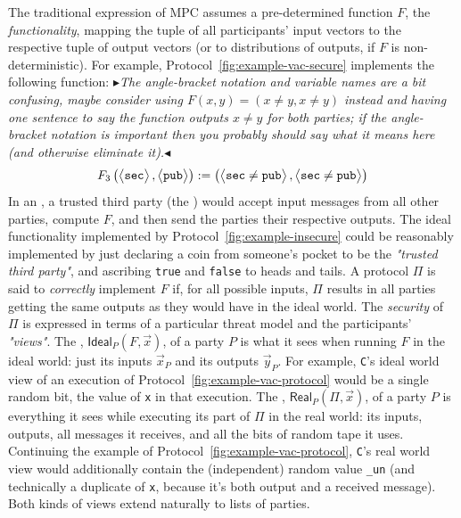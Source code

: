 \documentclass[acmlarge, manuscript, screen, review, anonymous, table]{acmart}
\newcommand{\bigpar}[1]{\left( #1 \right)}
\newcommand{\inlinecode}[2][cho]{\lstinline[language=#1]{#2}}
\newcommand{\vertvec}[1]{\left\langle { \renewcommand*{\arraystretch}{1}\begin{matrix} #1 \end{matrix} } \right\rangle}
\newcommand{\mynote}[2]
    {{\color{red} \fbox{\bfseries\sffamily\scriptsize#1}
    {\small$\blacktriangleright$\textsf{\emph{#2}}$\blacktriangleleft$}}~}
\newcommand{\todo}[1]{\mynote{TODO}{#1}}
\begin{document}
The traditional expression of MPC assumes a pre-determined function $F$, the \emph{functionality},
mapping the tuple of all participants' input vectors to the respective tuple of output vectors
(or to distributions of outputs, if $F$ is non-deterministic).
For example, Protocol~\ref{fig:example-vac-secure} implements the following function:\todo{The angle-bracket notation and variable names are a bit confusing, maybe consider using $F(x,y) = (x \not= y, x \not= y)$ instead and having one sentence to say the function outputs $x\not=y$ for both parties; if the angle-bracket notation is important then you probably should say what it means here (and otherwise eliminate it).}
$$F_3\bigpar{\vertvec{\mathtt{sec}}, \vertvec{\mathtt{pub}}}
  := \bigpar{\vertvec{\mathtt{sec} \neq \mathtt{pub}}, \vertvec{\mathtt{sec} \neq \mathtt{pub}}}$$
In an , a trusted third party (the ) would accept input messages
from all other parties, compute $F$, and then send the parties their respective outputs.
The ideal functionality implemented by Protocol~\ref{fig:example-insecure}
could be reasonably implemented by just declaring a coin from someone's pocket to be the \textit{"trusted third party"},
and ascribing \inlinecode{true} and \inlinecode{false} to heads and tails.
A  protocol $Π$ is said to \emph{correctly} implement $F$ if, for all possible inputs,
$Π$ results in all parties getting the same outputs as they would have in the ideal world.
The \emph{security} of $Π$ is expressed in terms of a particular threat model and the participants' \textit{"views"}.
The , $\mathsf{Ideal}_P(F,\vec{x})$, of a party $P$ is what it sees when running $F$ in the ideal world:
just its inputs $\vec{x}_P$ and its outputs $\vec{y}_P$.
For example, \inlinecode{C}'s ideal world view of an execution of Protocol~\ref{fig:example-vac-protocol}
would be a single random bit, the value of \inlinecode{x} in that execution.
The , $\mathsf{Real}_P(Π, \vec{x})$, of a party $P$ is everything it sees while executing its part of $Π$ in the real world:
its inputs, outputs, all messages it receives, and all the bits of random tape it uses.
Continuing the example of Protocol~\ref{fig:example-vac-protocol}, \inlinecode{C}'s real world view would additionally contain
the (independent) random value \inlinecode{_un}
(and technically a duplicate of \inlinecode{x}, because it's both output and a received message).
Both kinds of views extend naturally to lists of parties.
\end{document}
